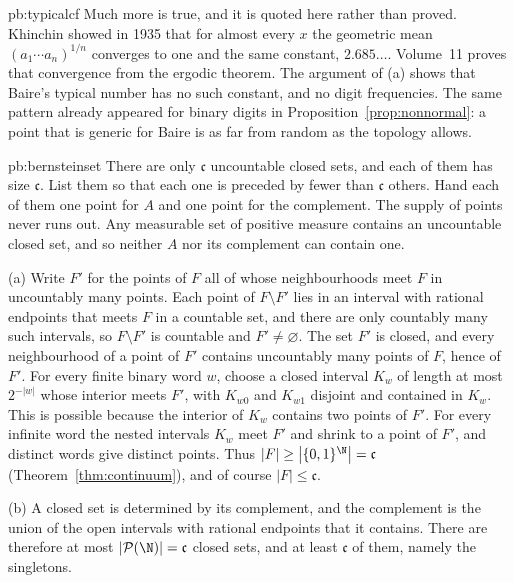\begin{solution}{pb:typicalcf}
\leads Much more is true, and it is quoted here rather than proved. Khinchin showed in 1935 that for almost every $x$ the geometric mean $(a_1\cdots a_n)^{1/n}$ converges to one and the same constant, $2.685\ldots$. Volume~11 proves that convergence from the ergodic theorem. The argument of (a) shows that Baire's typical number has no such constant, and no digit frequencies. The same pattern already appeared for binary digits in Proposition~\ref{prop:nonnormal}: a point that is generic for Baire is as far from random as the topology allows.
\end{solution}

\begin{solution}{pb:bernsteinset}
\idea There are only $\mathfrak c$ uncountable closed sets, and each of them has size $\mathfrak c$. List them so that each one is preceded by fewer than $\mathfrak c$ others. Hand each of them one point for $A$ and one point for the complement. The supply of points never runs out. Any measurable set of positive measure contains an uncountable closed set, and so neither $A$ nor its complement can contain one.

\writeup (a) Write $F'$ for the points of $F$ all of whose neighbourhoods meet $F$ in uncountably many points. Each point of $F\setminus F'$ lies in an interval with rational endpoints that meets $F$ in a countable set, and there are only countably many such intervals, so $F\setminus F'$ is countable and $F'\ne\varnothing$. The set $F'$ is closed, and every neighbourhood of a point of $F'$ contains uncountably many points of $F$, hence of $F'$. For every finite binary word $w$, choose a closed interval $K_w$ of length at most $2^{-|w|}$ whose interior meets $F'$, with $K_{w0}$ and $K_{w1}$ disjoint and contained in $K_w$. This is possible because the interior of $K_w$ contains two points of $F'$. For every infinite word the nested intervals $K_w$ meet $F'$ and shrink to a point of $F'$, and distinct words give distinct points. Thus $|F|\ge\bigl|\{0,1\}^\N\bigr|=\mathfrak c$ (Theorem~\ref{thm:continuum}), and of course $|F|\le\mathfrak c$.

(b) A closed set is determined by its complement, and the complement is the union of the open intervals with rational endpoints that it contains. There are therefore at most $|\mathcal P(\N)|=\mathfrak c$ closed sets, and at least $\mathfrak c$ of them, namely the singletons.


\end{solution}
